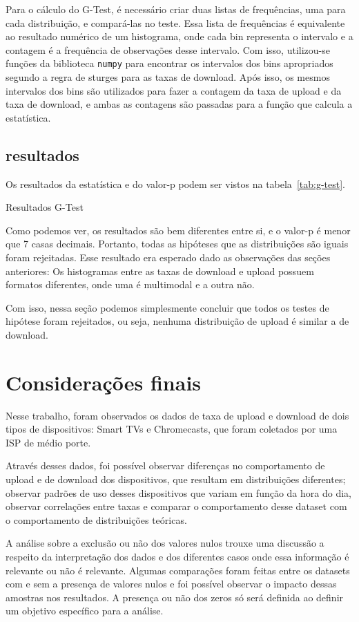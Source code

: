\documentclass{article}
\begin{document}
Para o cálculo do G-Test, é necessário criar duas listas de frequências, uma para cada distribuição, e compará-las no teste. Essa lista de frequências é equivalente ao resultado numérico de um histograma, onde cada bin representa o intervalo e a contagem é a frequência de observações desse intervalo. Com isso, utilizou-se funções da biblioteca \texttt{numpy} para encontrar os intervalos dos bins apropriados segundo a regra de sturges para as taxas de download. Após isso, os mesmos intervalos dos bins são utilizados para fazer a contagem da taxa de upload e da taxa de download, e ambas as contagens são passadas para a função que calcula a estatística.

\subsection{resultados}

Os resultados da estatística e do valor-p podem ser vistos na tabela~\ref{tab:g-test}.

\begin{table}[h]
	\centering
	
	\caption{Resultados G-Test}
	\label{tab:g-test}
\end{table}

Como podemos ver, os resultados são bem diferentes entre si, e o valor-p é menor que 7 casas decimais. Portanto, todas as hipóteses que as distribuições são iguais foram rejeitadas. Esse resultado era esperado dado as observações das seções anteriores: Os histogramas entre as taxas de download e upload possuem formatos diferentes, onde uma é multimodal e a outra não.

Com isso, nessa seção podemos simplesmente concluir que todos os testes de hipótese foram rejeitados, ou seja, nenhuma distribuição de upload é similar a de download.

\section{Considerações finais}

Nesse trabalho, foram observados os dados de taxa de upload e download de dois tipos de dispositivos: Smart TVs e Chromecasts, que foram coletados por uma ISP de médio porte.

Através desses dados, foi possível observar diferenças no comportamento de upload e de download dos dispositivos, que resultam em distribuições diferentes; observar padrões de uso desses dispositivos que variam em função da hora do dia, observar correlações entre taxas e comparar o comportamento desse dataset com o comportamento de distribuições teóricas.

A análise sobre a exclusão ou não dos valores nulos trouxe uma discussão a respeito da interpretação dos dados e dos diferentes casos onde essa informação é relevante ou não é relevante. Algumas comparações foram feitas entre os datasets com e sem a presença de valores nulos e foi possível observar o impacto dessas amostras nos resultados. A presença ou não dos zeros só será definida ao definir um objetivo específico para a análise.

%
\end{document}
